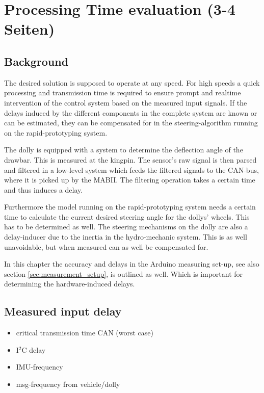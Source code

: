 \documentclass[ExampleMasters.tex]{subfiles}
\begin{document}
\clearpage
\chapter{Processing Time evaluation (3-4 Seiten)}
\label{chap:processing_time_delay}
\section{Background}
The desired solution is supposed to operate at any speed. For high speeds a quick processing and transmission time is required to ensure prompt and realtime intervention of the control system based on the measured input signals. If the delays induced by the different components in the complete system are known or can be estimated, they can be compensated for in the steering-algorithm running on the rapid-prototyping system.

The dolly is equipped with a system to determine the deflection angle of the drawbar. This is measured at the kingpin. The sensor's raw signal is then parsed and filtered in a low-level system which feeds the filtered signals to the CAN-bus, where it is picked up by the MABII. The filtering operation takes a certain time and thus induces a delay. 

Furthermore the model running on the rapid-prototyping system needs a certain time to calculate the current desired steering angle for the dollys' wheels. This has to be determined as well. The steering mechanisms on the dolly are also a delay-inducer due to the inertia in the hydro-mechanic system. This is as well unavoidable, but when measured can as well be compensated for. 


In this chapter the accuracy and delays in the Arduino measuring set-up, see also section \ref{sec:measurement_setup}, is outlined as well. Which is important for determining the hardware-induced delays.


\section{Measured input delay}
\label{sec:measuring_delay}
\begin{itemize}
	\item critical transmission time CAN (worst case)
	\item I$^2$C delay
	\item IMU-frequency
	\item msg-frequency from vehicle/dolly
	
\end{itemize}
\end{document}
